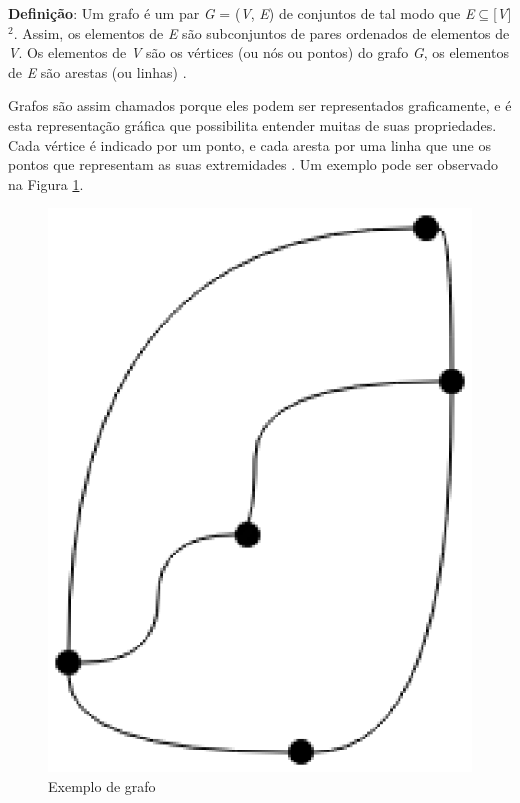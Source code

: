 \textbf{Definição}: Um grafo é um par \textit{G} = (\textit{V}, \textit{E}) de conjuntos de tal modo que \textit{E}$\subseteq$[\textit{V}]$^2$. Assim, os elementos de \textit{E} são subconjuntos de pares ordenados de elementos de \textit{V}. Os elementos de \textit{V} são os vértices (ou nós ou pontos) do grafo \textit{G}, os elementos de \textit{E} são arestas (ou linhas) \cite{Diestel:1997}.

Grafos são assim chamados porque eles podem ser representados graficamente, e é esta representação gráfica que possibilita entender muitas de suas propriedades. Cada vértice é indicado por um ponto, e cada aresta por uma linha que une os pontos que representam as suas extremidades \cite{Bondy:2007}. Um exemplo pode ser observado na Figura \ref{exemplo_grafo}.

\begin{figure}[!h]
	\centering
	\includegraphics[scale=0.3]{figuras/capitulo2/exemplo_grafo.eps}
	\caption[Exemplo de grafo]{Exemplo de grafo \cite{Bondy:2007}}
	\label{exemplo_grafo}
\end{figure}

